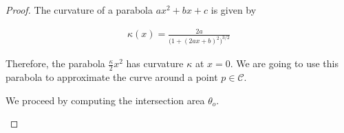 \begin{proof} The curvature of a parabola $ax^2 + bx +c$ is given by

\begin{align*}
	\kappa(x) = \frac{2a}{\big(1+(2ax+b)^2\big)^{3/2}}
\end{align*}

Therefore, the parabola $\frac{\kappa}{2}x^2$ has curvature $\kappa$ at $x=0$. We are going to use this parabola to approximate the curve around a point $p \in \mathcal{C}$.

We proceed by computing the intersection area $\theta_o$.


\begin{figure}[h!]\label{fig:parabola-approx-ex}
\center
	\hspace{20pt}%
\end{figure}
\end{proof}
